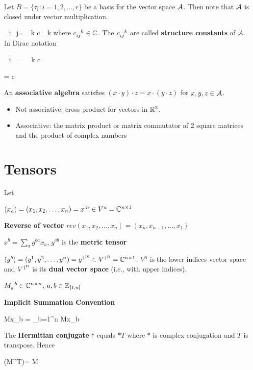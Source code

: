 Let $B = \{\tau_i: i=1, 2, \ldots, r\}$
be a basis for the vector space ${\cal A}$. 
Then note that
${\cal A}$ is closed under vector multiplication. 

\beq
\tau_i\cdot \tau_j=
\sum_k c \tau_k
\eeq
where $c\indices{_{ij}^k}\in\CC$.
The $c\indices{_{ij}^k}$ are called 
{\bf structure constants} of ${\cal A}$.
In Dirac notation

\beq
\tau_i=
=
\sum_k c
\eeq

\beq
{}= c
\eeq

An {\bf associative algebra} satisfies 
$(x\cdot y)\cdot z = x\cdot(y\cdot z)$ for
$x,y,z\in {\cal A}$.
\begin{itemize}
\item Not associative: cross product for vectors in  ${ \mathbb{R}}^3$.
\item Associative:
the matrix product or matrix commutator of 2  square matrices and the product of complex numbers
\end{itemize}

\section{Tensors}
\label{sec-tensors}
Let 

$(x_a)=(x_1, x_2, \ldots, x_n) = x^{:n}\in V^n={ \mathbb{C}}^{n\times 1}$

{\bf Reverse of vector} $rev(x_1, x_2, \ldots, x_n)=
(x_n, x_{n-1},
\ldots, x_1)$

$x^b = \sum_a g^{ba} x_a$, $g^{ab}$ is the
{\bf metric tensor}

$(y^b)=(y^1, y^2, \ldots, y^n)= {y^\dagger}^{:n}\in {V^\dagger}^n={ \mathbb{C}}^{n\times 1}$. $V^n$ is the lower indices vector space and
${V^\dagger}^n$ is its {\bf dual vector space} (i.e., with upper indices).



$M\indices{_a^b}\in \CC^{n\times n}$, $a, b\in{\mathbb{Z}}_{[1,n]}$

{\bf Implicit Summation Convention}

\beq
Mx_b = \sum_{b=1}^n
Mx_b
\eeq



The {\bf Hermitian conjugate} $\dagger$
equals $*T$ where $*$ is complex conjugation and $T$ is transpose.
Hence

\beq
(M^T)= M
\eeq

